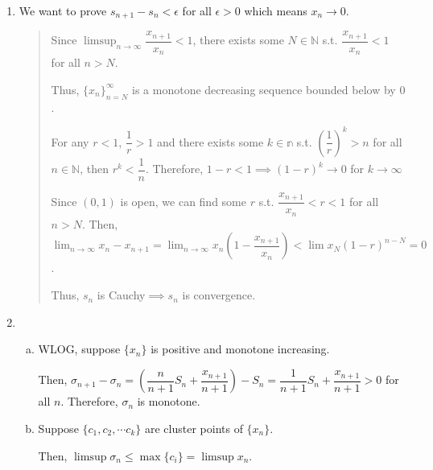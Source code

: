 \documentclass[12pt]{article}
\begin{document}
\begin{enumerate}
    \item We want to prove $s_{n+1} - s_n < \epsilon$ for all $\epsilon > 0$ which means $x_n \to 0$.
    \begin{quote}
        Since $\displaystyle\limsup_{n \to \infty} \dfrac{x_{n+1}}{x_n} < 1$, 
        there exists some $N\in \mathbb{N}$ s.t. $\dfrac{x_{n+1}}{x_n} < 1$ for all $n > N$.

        Thus, $\lbrace x_n\rbrace_{n = N}^\infty$ is a monotone decreasing sequence bounded below by $0$.

        For any $r < 1$, $\dfrac{1}{r} > 1$ and there exists some $k \in \mathbb{n}$ s.t. $(\dfrac{1}{r})^k > n$ for all $n\in \mathbb{N}$,
        then $r^k < \dfrac{1}{n}$. Therefore, $1-r < 1\implies (1-r)^k \to 0$ for $k \to \infty$
        
        Since $(0, 1)$ is open, we can find some $r$ s.t.  $\dfrac{x_{n+1}}{x_n} < r < 1$ for all $n > N$. 
        Then, $\displaystyle\lim_{n \to \infty} x_n - x_{n+1} = \displaystyle\lim_{n\to \infty} x_n(1-\dfrac{x_{n+1}}{x_n}) < \lim x_N (1 - r)^{n-N} = 0$.

        Thus, $s_n$ is Cauchy$\implies s_n$ is convergence.
    \end{quote}

    \newpage
    \item \begin{enumerate}[(a)]
        \item WLOG, suppose $\lbrace x_n \rbrace$ is positive and monotone increasing.
        
        Then, $\sigma_{n+1} - \sigma_n = (\dfrac{n}{n+1} S_n + \dfrac{x_{n+1}}{n+1}) - S_n = \dfrac{1}{n+1}S_n + \dfrac{x_{n+1}}{n+1} > 0$ for all $n$.
        Therefore, $\sigma_n$ is monotone.

        \item Suppose $\lbrace c_1, c_2, \cdots c_k\rbrace$ are cluster points of $\lbrace x_n \rbrace$.
        
        Then, $\limsup \sigma_n \leq \max\lbrace c_i\rbrace = \limsup x_n$.
    \end{enumerate}
\end{enumerate}
\end{document}
